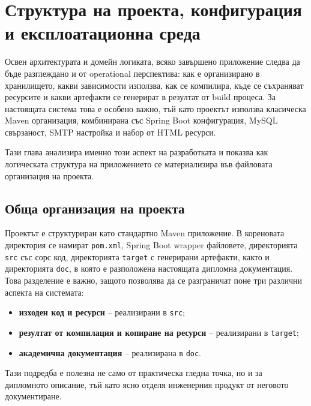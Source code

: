 \section{Структура на проекта, конфигурация и експлоатационна среда}

Освен архитектурата и домейн логиката, всяко завършено приложение следва да бъде разглеждано и от operational перспектива: как е организирано в хранилището, какви зависимости използва, как се компилира, къде се съхраняват ресурсите и какви артефакти се генерират в резултат от build процеса. За настоящата система това е особено важно, тъй като проектът използва класическа Maven организация, комбинирана със Spring Boot конфигурация, MySQL свързаност, SMTP настройка и набор от HTML ресурси.

Тази глава анализира именно този аспект на разработката и показва как логическата структура на приложението се материализира във файловата организация на проекта.

\subsection{Обща организация на проекта}

Проектът е структуриран като стандартно Maven приложение. В кореновата директория се намират \texttt{pom.xml}, Spring Boot wrapper файловете, директорията \texttt{src} със сорс код, директорията \texttt{target} с генерирани артефакти, както и директорията \texttt{doc}, в която е разположена настоящата дипломна документация. Това разделение е важно, защото позволява да се разграничат поне три различни аспекта на системата:

\begin{itemize}[leftmargin=*]
    \item \textbf{изходен код и ресурси} -- реализирани в \texttt{src};
    \item \textbf{резултат от компилация и копиране на ресурси} -- реализирани в \texttt{target};
    \item \textbf{академична документация} -- реализирана в \texttt{doc}.
\end{itemize}

Тази подредба е полезна не само от практическа гледна точка, но и за дипломното описание, тъй като ясно отделя инженерния продукт от неговото документиране.

